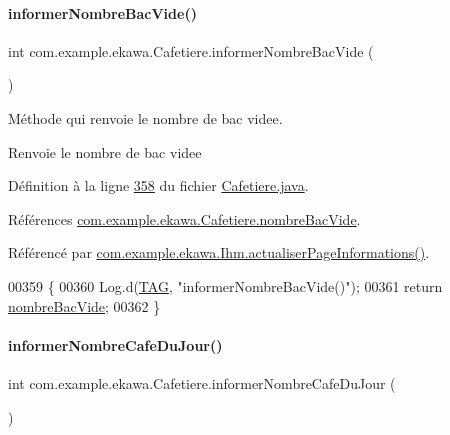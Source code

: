 \paragraph{\texorpdfstring{informer\+Nombre\+Bac\+Vide()}{informerNombreBacVide()}}
{\footnotesize\ttfamily int com.\+example.\+ekawa.\+Cafetiere.\+informer\+Nombre\+Bac\+Vide (\begin{DoxyParamCaption}{ }\end{DoxyParamCaption})}



Méthode qui renvoie le nombre de bac videe. 

\begin{DoxyReturn}{Renvoie}
le nombre de bac videe 
\end{DoxyReturn}


Définition à la ligne \hyperlink{_cafetiere_8java_source_l00358}{358} du fichier \hyperlink{_cafetiere_8java_source}{Cafetiere.\+java}.



Références \hyperlink{_cafetiere_8java_source_l00099}{com.\+example.\+ekawa.\+Cafetiere.\+nombre\+Bac\+Vide}.



Référencé par \hyperlink{_ihm_8java_source_l00919}{com.\+example.\+ekawa.\+Ihm.\+actualiser\+Page\+Informations()}.


\begin{DoxyCode}
00359     \{
00360         Log.d(\hyperlink{classcom_1_1example_1_1ekawa_1_1_cafetiere_aa0c1fd99a2508b06c462aea17034aa91}{TAG}, \textcolor{stringliteral}{"informerNombreBacVide()"});
00361         \textcolor{keywordflow}{return} \hyperlink{classcom_1_1example_1_1ekawa_1_1_cafetiere_a6491d6d04db5d6e7da868565b84f6d7f}{nombreBacVide};
00362     \}
\end{DoxyCode}
\mbox{\label{classcom_1_1example_1_1ekawa_1_1_cafetiere_ac93a294ca5d2dcd4cc9c54bf5c41c3e4}} 
\paragraph{\texorpdfstring{informer\+Nombre\+Cafe\+Du\+Jour()}{informerNombreCafeDuJour()}}
{\footnotesize\ttfamily int com.\+example.\+ekawa.\+Cafetiere.\+informer\+Nombre\+Cafe\+Du\+Jour (\begin{DoxyParamCaption}{ }\end{DoxyParamCaption})}



